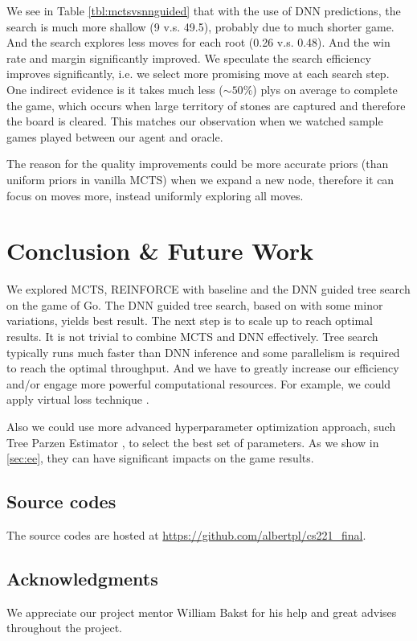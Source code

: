 \documentclass{article}
\begin{document}
We see in Table \ref{tbl:mctsvsnnguided} that with the use of DNN predictions, the search is much more shallow (9 v.s. 49.5), probably due to much shorter game. And the search explores less moves for each root (0.26 v.s. 0.48).  And the win rate and margin significantly improved. We speculate the search efficiency improves significantly, i.e. we select more promising move at each search step. One indirect evidence is it takes much less ($\sim 50\%$) plys on average to complete the game, which occurs when large territory of stones are captured and therefore the board is cleared. This matches our observation when we watched sample games played between our agent and oracle.

The reason for the quality improvements could be more accurate priors (than uniform priors in vanilla MCTS) when we expand a new node, therefore it can focus on moves more, instead uniformly exploring all moves.

\section{Conclusion \& Future Work}
We explored MCTS, REINFORCE with baseline and the DNN guided tree search on the game of Go.  The DNN guided tree search, based on \cite{silver2017masteringalphazero} with some minor variations, yields best result. The next step is to scale up to reach optimal results. 
It is not trivial to combine MCTS and DNN effectively. Tree search typically runs much faster than DNN inference and some parallelism is required to reach the optimal throughput.  And we have to greatly increase our efficiency and/or engage more powerful computational resources. For example, we could apply virtual loss technique \cite{chaslot2008parallel}.

Also we could use more advanced hyperparameter optimization approach, such Tree Parzen Estimator \cite{bergstra2011algorithms} \cite{bergstra2013making}, to select the best set of parameters. As we show in \ref{sec:ee}, they can have significant impacts on the game results.

\subsection*{Source codes}
    The source codes are hosted at \url{https://github.com/albertpl/cs221_final}.

\subsection*{Acknowledgments}
We appreciate our project mentor William Bakst for his help and great advises throughout the project.
\end{document}
